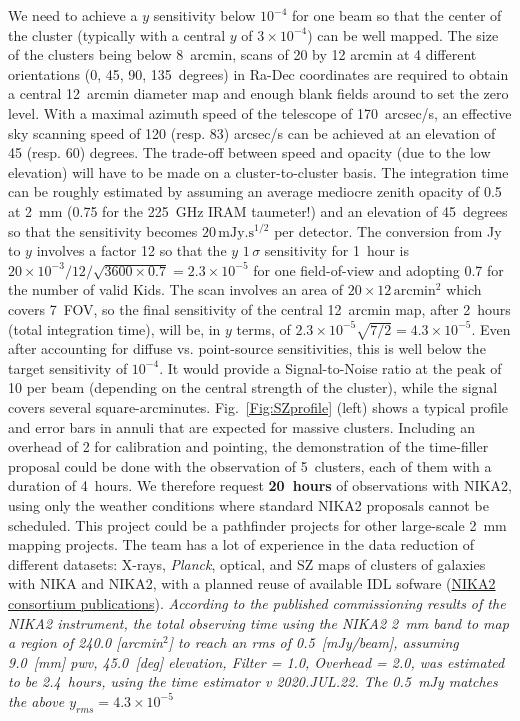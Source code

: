 \documentclass[10pt,a4paper,twoside,graphicx,color]{article}
\begin{document}
We need to achieve a $y$ sensitivity below $10^{-4}$ for one beam so
that the center of the cluster (typically with a central $y$ of
$3\times 10^{-4}$) can be well mapped. The size of the clusters being
below 8~arcmin, scans of 20 by 12 arcmin at 4 different orientations
(0, 45, 90, 135~degrees) in Ra-Dec coordinates are required to obtain
a central 12~arcmin diameter map and enough blank fields around to set
the zero level. With a maximal azimuth speed of the telescope of
170~arcsec/s, an effective sky scanning speed of 120 (resp. 83)
arcsec/s can be achieved at an elevation of 45 (resp. 60) degrees. The
trade-off between speed and opacity (due to the low elevation) will
have to be made on a cluster-to-cluster basis. The integration time
can be roughly estimated by assuming an average mediocre zenith
opacity of 0.5 at 2~mm (0.75 for the 225~GHz IRAM taumeter!) and an
elevation of 45~degrees so that the sensitivity becomes
$20\,\mathrm{mJy.s^{1/2}}$ per detector. The conversion from Jy to $y$
involves a factor 12 so that the $y$ $1\,\sigma$ sensitivity for
1~hour is $20\times 10^{-3}/12/\sqrt{3600\times 0.7}=2.3\times
10^{-5}$ for one field-of-view and adopting 0.7 for the number of
valid Kids. The scan involves an area of $20\times
12\,\mathrm{arcmin^2}$ which covers 7~FOV, so the final sensitivity of
the central 12~arcmin map, after 2~hours (total integration time),
will be, in $y$ terms, of $2.3\times 10^{-5}\sqrt{7/2}=4.3\times
10^{-5}$. Even after accounting for diffuse vs. point-source
sensitivities, this is well below the target sensitivity of
$10^{-4}$. It would provide a Signal-to-Noise ratio at the peak of 10
per beam (depending on the central strength of the cluster), while the
signal covers several square-arcminutes. Fig.~\ref{Fig:SZprofile}
(left) shows a typical profile and error bars in annuli that are
expected for massive clusters. Including an overhead of 2 for
calibration and pointing, the demonstration of the time-filler
proposal could be done with the observation of 5~clusters, each of
them with a duration of 4~hours. We therefore request {\bf 20~hours}
of observations with NIKA2, using only the weather conditions where
standard NIKA2 proposals cannot be scheduled. This project could be a
pathfinder projects for other large-scale 2~mm mapping projects. The
team has a lot of experience in the data reduction of different
datasets: X-rays, {\sl Planck}, optical, and SZ maps of clusters of
galaxies with NIKA and NIKA2, with a planned reuse of available IDL
sofware (\href{https://ipag.osug.fr/nika2/Publications.html}{NIKA2
  consortium publications}).  {\sl According to the published
  commissioning results of the NIKA2 instrument, the total observing
  time using the NIKA2 2~mm band to map a region of 240.0 [arcmin$^2$]
  to reach an rms of 0.5~[mJy/beam], assuming 9.0~[mm] pwv, 45.0~[deg]
  elevation, Filter = 1.0, Overhead = 2.0, was estimated to be
  2.4~hours, using the time estimator v 2020.JUL.22. The 0.5~mJy
  matches the above $y_{rms}=4.3\times 10^{-5}$}
\end{document}
